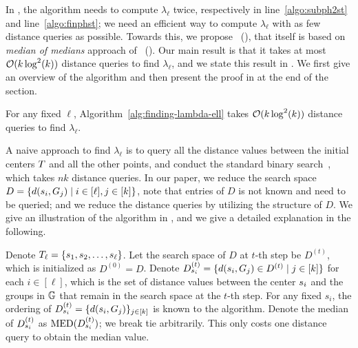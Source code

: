 In , the algorithm needs to compute $\lambda_{\ell}$ twice, respectively in line~\ref{algo:subph2st} and line~\ref{algo:finphst}; we need an efficient way to compute $\lambda_{\ell}$ with as few distance queries as possible. 
Towards this, we propose~ (\findlambda), that itself is based on \emph{median of medians} approach of~ (\mom).
Our main result is that it takes at most $\mathcal{O}(k \log^2(k))$ distance queries to find $\lambda_{\ell}$, and we state this result in . 
We first give an overview of the algorithm and then present the proof in  at the end of the section.

\begin{theorem}
    \label{theorem:min-lambda-with-perfect-matching}
    For any fixed $\ell$, Algorithm~\ref{alg:finding-lambda-ell} takes $\mathcal{O}(k \log^2(k))$ distance queries to find $\lambda_\ell$.
\end{theorem}

A naive approach to find $\lambda_{\ell}$ is to query all the distance values between the initial centers $T$ and all the other points, and conduct the standard binary search~\cite{gadekar2025fair}, which takes $nk$ distance queries.  
In our paper, we reduce the search space $D = \{d(s_i, G_j) \mid i \in [\ell], j \in [k]\}$, note that entries of $D$ is not known and need to be queried; and we reduce the distance queries by utilizing the structure of $D$.
We give an illustration of the algorithm in , and we give a detailed explanation in the following. 


Denote $T_{\ell} = \{s_1, s_2, \dots, s_{\ell}\}$. 
Let the search space of $D$ at $t$-th step be $D^{(t)}$, which is initialized as $D^{(0)} = D$.  
Denote $D_{s_i}^{(t)} = \{d(s_i, G_j) \in D^{(t)} \mid j \in [k]\}$ for each $i \in [\ell]$, which is the set of distance values between the center $s_i$ and the groups in $\mathbb{G}$ that remain in the search space at the $t$-th step.
For any fixed $s_i$, the ordering of $D_{s_i}^{(t)} = \{d(s_i, G_j)\}_{j \in [k]}$ is known to the algorithm.
Denote the median of $D_{s_i}^{(t)}$ as $\operatorname{MED}(D_{s_i}^{(t)})$; we break tie arbitrarily.  
This only costs one distance query to obtain the median value. 

